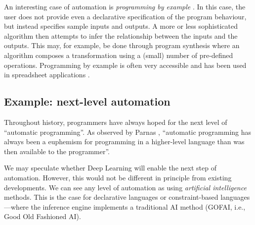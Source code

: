 \documentclass[ twoside,openright,titlepage,numbers=noenddot,headinclude,footinclude,cleardoublepage=empty,abstract=on,
                BCOR=5mm,paper=a4,fontsize=11pt
                ]{scrreprt}
\newcommand{\joel}[1]{}
\theoremstyle{definition}
\begin{document}
An interesting case of automation is \emph{programming by example}
\parencite{PBE}. In this case, the user does not provide even a
declarative specification of the program behaviour, but instead
specifies sample inputs and outputs. A more or less sophisticated
algorithm then attempts to infer the relationship between the inputs and
the outputs. This may, for example, be done through program synthesis
where an algorithm composes a transformation using a (small) number of
pre-defined operations. Programming by example is often very accessible
and has been used in spreadsheet applications \parencite{PBEExcel}.

\joel{ Sad to get rid of this, but we should find a better way to include Kell's fragmentation.
## Remark: fragmentation
An interesting issue is that reusable components that enable higher levels of automation are often specific to each system. This, arguably, limits what we can achieve as components that enable higher-levels of automation are increasingly complex to implement. For example, the resolution algorithm that is at the core of a Prolog system is typically tightly bound to the particular system and cannot be easily reused by another programming system.

As noted in \parencite{KellOS,Mythical}, incompatible reusable components that exist for multiple systems also limit compositionality. One possible exception from the rule is the Z3 theorem prover, which is used as an implementation mechanism by multiple programming systems including Dafny and F*, as well as by numerous program verification tools.
}

\hypertarget{example-next-level-automation}{\subsection{Example: next-level
automation}\label{example-next-level-automation}}

Throughout history, programmers have always hoped for the next level of
``automatic programming''. As observed by Parnas \parencite{Euphemism},
``automatic programming has always been a euphemism for programming in a
higher-level language than was then available to the programmer''.

We may speculate whether Deep Learning will enable the next step of
automation. However, this would not be different in principle from
existing developments. We can see any level of automation as using
\emph{artificial intelligence} methods. This is the case for declarative
languages or constraint-based languages---where the inference engine
implements a traditional AI method (GOFAI, i.e., Good Old Fashioned AI).
\end{document}
